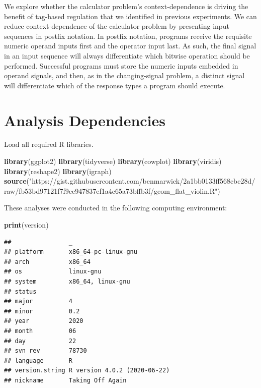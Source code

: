 \documentclass[
]{book}
\newenvironment{Shaded}{\begin{snugshade}}{\end{snugshade}}
\newcommand{\KeywordTok}[1]{\textcolor[rgb]{0.13,0.29,0.53}{\textbf{#1}}}
\newcommand{\NormalTok}[1]{#1}
\newcommand{\StringTok}[1]{\textcolor[rgb]{0.31,0.60,0.02}{#1}}
\begin{document}
We explore whether the calculator problem's context-dependence is driving the benefit of tag-based regulation that we identified in previous experiments.
We can reduce context-dependence of the calculator problem by presenting input sequences in postfix notation.
In postfix notation, programs receive the requisite numeric operand inputs first and the operator input last.
As such, the final signal in an input sequence will always differentiate which bitwise operation should be performed.
Successful programs must store the numeric inputs embedded in operand signals, and then, as in the changing-signal problem, a distinct signal will differentiate which of the response types a program should execute.

\hypertarget{analysis-dependencies-5}{%
\section{Analysis Dependencies}\label{analysis-dependencies-5}}

Load all required R libraries.

\begin{Shaded}
\begin{Highlighting}[]
\KeywordTok{library}\NormalTok{(ggplot2)}
\KeywordTok{library}\NormalTok{(tidyverse)}
\KeywordTok{library}\NormalTok{(cowplot)}
\KeywordTok{library}\NormalTok{(viridis)}
\KeywordTok{library}\NormalTok{(reshape2)}
\KeywordTok{library}\NormalTok{(igraph)}
\KeywordTok{source}\NormalTok{(}\StringTok{"https://gist.githubusercontent.com/benmarwick/2a1bb0133ff568cbe28d/raw/fb53bd97121f7f9ce947837ef1a4c65a73bffb3f/geom\_flat\_violin.R"}\NormalTok{)}
\end{Highlighting}
\end{Shaded}

These analyses were conducted in the following computing environment:

\begin{Shaded}
\begin{Highlighting}[]
\KeywordTok{print}\NormalTok{(version)}
\end{Highlighting}
\end{Shaded}

\begin{verbatim}
##                _                           
## platform       x86_64-pc-linux-gnu         
## arch           x86_64                      
## os             linux-gnu                   
## system         x86_64, linux-gnu           
## status                                     
## major          4                           
## minor          0.2                         
## year           2020                        
## month          06                          
## day            22                          
## svn rev        78730                       
## language       R                           
## version.string R version 4.0.2 (2020-06-22)
## nickname       Taking Off Again
\end{verbatim}
\end{document}
